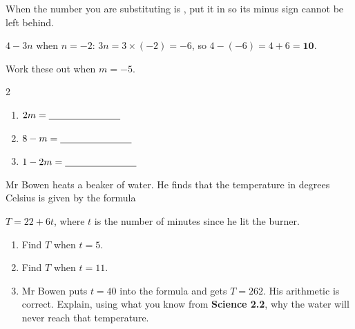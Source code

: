\documentclass[12pt,a4paper]{article}
\newcommand{\qlines}[1]{\par\needspace{\numexpr#1+1\relax\baselineskip}\wlines{#1}}
\begin{document}

\begin{remember}
  When the number you are substituting is , put it in
   so its minus sign cannot be left behind.

  \smallskip
  \hspace*{1.2em}$4 - 3n$ \; when $n = -2$: \quad
  $3n = 3 \times (-2) = -6$, \; so \; $4 - (-6) = 4 + 6 = \mathbf{10}$.
\end{remember}

\noindent Work these out when $m = -5$.

\vspace{4pt}
\begin{multicols}{2}
\begin{enumerate}[label=(\alph*), itemsep=11pt]
  \item $2m = \blank[2.6cm]$
  \item $8 - m = \blank[2.6cm]$
  \item $1 - 2m = \blank[2.6cm]$
\end{enumerate}
\end{multicols}


\noindent Mr Bowen heats a beaker of water. He finds that the temperature in degrees
Celsius is given by the formula

\smallskip
\noindent\hspace*{1.2em}$T = 22 + 6t$, \; where $t$ is the number of minutes since he
lit the burner.

\vspace{4pt}
\begin{enumerate}[label=(\alph*), itemsep=9pt]
  \item Find $T$ when $t = 5$. \hfill \blank[4.4cm]
  \item Find $T$ when $t = 11$. \hfill \blank[4.4cm]
  \item Mr Bowen puts $t = 40$ into the formula and gets $T = 262$. His arithmetic
        is correct. Explain, using what you know from \textbf{Science 2.2}, why the
        water will never reach that temperature.
\end{enumerate}
\qlines{2}
\end{document}

